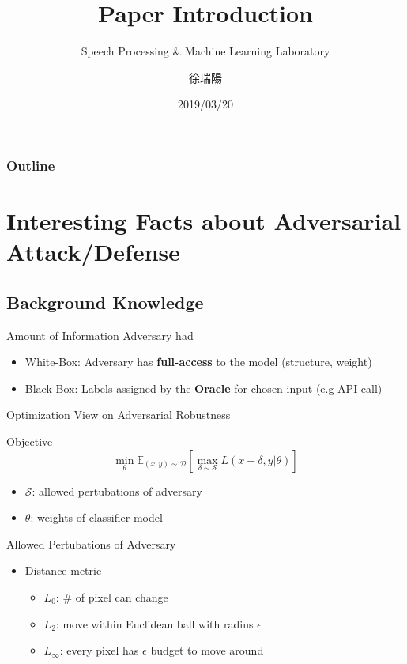 \documentclass{beamer}
\title{Paper Introduction}
\subtitle{\textcolor[rgb]{0.00,0.50,1.00}{{Speech Processing \& Machine Learning Laboratory}}}
\author{徐瑞陽}
\date{2019/03/20}
\begin{document}
\begin{frame}
\maketitle
\end{frame}

\begin{frame}
\frametitle{Outline}
\tableofcontents
\end{frame}

\section{Interesting Facts about Adversarial Attack/Defense}
\subsection{Background Knowledge}
\begin{frame}{Amount of Information Adversary had}
    \begin{itemize}
      \item White-Box: Adversary has \textbf{full-access} to the model (structure, weight)
      \item Black-Box: Labels assigned by the \textbf{Oracle} for chosen input (e.g API call)
    \end{itemize}
\end{frame}

\begin{frame}{Optimization View on Adversarial Robustness}
  \begin{block}{Objective}
    \[ \min_\theta \mathbb{E}_{(x,y) \sim \mathcal{D}}[\max_{\delta \sim \mathcal{S}}L(x+\delta,y|\theta)]\]
  \end{block}
  \begin{itemize}
    \item $\mathcal{S}$: allowed pertubations of adversary
    \item $\theta$: weights of classifier model
  \end{itemize}
\end{frame}

\begin{frame}{Allowed Pertubations of Adversary}
  \begin{itemize}
    \item Distance metric
      \begin{itemize}
        \item $L_0$: \# of pixel can change
        \item $L_2$: move within Euclidean ball with radius $\epsilon$
        \item $L_\infty$: every pixel has $\epsilon$ budget to move around
      \end{itemize}
  \end{itemize}
\end{frame}
\end{document}
